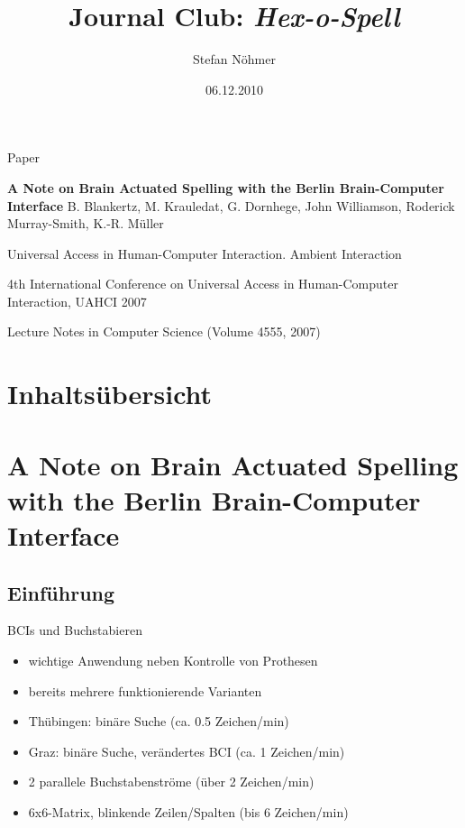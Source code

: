 \documentclass{beamer}
\title{Journal Club: \emph{Hex-o-Spell}}
\author{Stefan Nöhmer}
\date{06.12.2010}
\begin{document}
	\frame{\titlepage}
	
	\begin{frame}{Paper}
	  
	  \begin{block}{\textbf{A Note on Brain Actuated Spelling with the Berlin Brain-Computer Interface}}
	    B. Blankertz, M. Krauledat, G. Dornhege, John Williamson, Roderick Murray-Smith, K.-R. Müller
	    
	    Universal Access in Human-Computer Interaction. Ambient Interaction
	    
      4th International Conference on Universal Access in Human-Computer Interaction, UAHCI 2007
      
      Lecture Notes in Computer Science (Volume 4555, 2007)
    \end{block}
  \end{frame}
	
	\section{Inhaltsübersicht}
	\frame{\tableofcontents}
	
	
	\section[Brain Actuated Spelling]{A Note on Brain Actuated Spelling with the Berlin Brain-Computer Interface}
		
		\subsection{Einführung}
		\begin{frame}[<+->]{BCIs und Buchstabieren}
			\begin{block}{}
				\begin{itemize}
					\item wichtige Anwendung neben Kontrolle von Prothesen
					\item bereits mehrere funktionierende Varianten
					\item Thübingen: binäre Suche (ca. 0.5 Zeichen/min)
					\item Graz: binäre Suche, verändertes BCI (ca. 1 Zeichen/min)
					\item 2 parallele Buchstabenströme (über 2 Zeichen/min)
					\item 6x6-Matrix, blinkende Zeilen/Spalten (bis 6 Zeichen/min)
				\end{itemize}
			\end{block}
		\end{frame}
		
\end{document}
